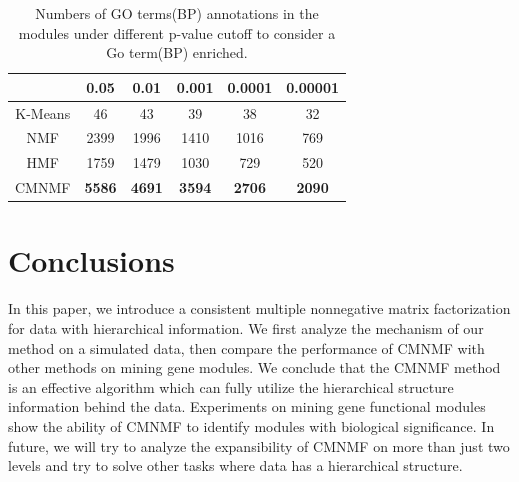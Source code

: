 \documentclass{bmcart}
\begin{document}
\begin{table}
\centering
\caption{Numbers of GO terms(BP) annotations in the modules under different p-value cutoff to consider a Go term(BP) enriched.}
\label{tab:go}
\begin{tabular}{|c||c|c|c|c|c|}
\hline
 &0.05 & 0.01& 0.001&0.0001&0.00001\\
\hline
\hline
K-Means&46  & 43& 39&38&32\\
\hline
NMF&2399 & 1996&1410&1016&769\\
\hline
HMF&1759& 1479&1030&729&520\\
\hline
CMNMF&\textbf{5586}& \textbf{4691}& \textbf{3594}&\textbf{2706}&\textbf{2090}\\
\hline
\end{tabular}
\end{table}

\section*{Conclusions}
In this paper, we introduce a consistent multiple nonnegative matrix factorization for data with hierarchical information. We first analyze the mechanism of our method on a simulated data, then compare the performance of CMNMF with other methods on mining gene modules. We conclude that the CMNMF method is an effective algorithm which can fully utilize the hierarchical structure information behind the data. Experiments on mining gene functional modules show the ability of CMNMF to identify modules with biological significance. In future, we will try to analyze the expansibility of CMNMF on more than just two levels and try to solve other tasks where data has a hierarchical structure.


\end{document}
